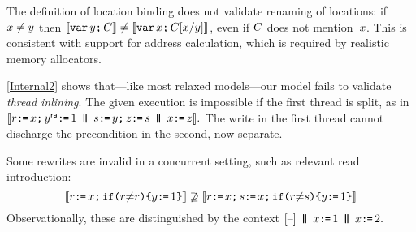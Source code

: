 


The definition of location binding does not validate renaming of locations:
if $x\neq y$ then
$\llbracket\texttt{var}\,y\texttt{;}\,\allowbreak C\rrbracket\neq\llbracket\texttt{var}\,x\texttt{;}\,\allowbreak C[x/y]\rrbracket$, even
if $C$ does not mention~$x$.  This is consistent with support for
address calculation, which is required by realistic memory allocators.

\ref{Internal2} shows that---like most relaxed models---our model
fails to validate \emph{thread inlining}.  The given execution is impossible
if the first thread is split, as in
\begin{math}
  \sem{\aReg\GETS x\SEMI
  y\REL\GETS 1\PAR
  \bReg\GETS y\SEMI
  z\GETS \bReg
  \PAR
  x\GETS z}.
\end{math}
The write in the first thread cannot discharge the precondition in the
second, now separate.


Some rewrites are invalid in a concurrent setting, such as
relevant read introduction:
\begin{displaymath}
  \llbracket r \texttt{:}\mkern-1mu\texttt{=}\, x \texttt{;}\,\allowbreak \texttt{if}\allowbreak\texttt{(}r {\neq} r\texttt{)} \allowbreak\texttt{\{} y \texttt{:}\mkern-1mu\texttt{=}\, 1 \texttt{\}}\rrbracket
  \not\supseteq
  \llbracket r \texttt{:}\mkern-1mu\texttt{=}\, x \texttt{;}\,\allowbreak s \texttt{:}\mkern-1mu\texttt{=}\, x  \texttt{;}\,\allowbreak \texttt{if}\allowbreak\texttt{(}r {\neq}s\texttt{)} \allowbreak\texttt{\{} y \texttt{:}\mkern-1mu\texttt{=}\, 1 \texttt{\}}\rrbracket
\end{displaymath}
Observationally, these are distinguished by the context %
\begin{math}
  \hole{} \PAR x\GETS1\PAR x\GETS2.
\end{math}

